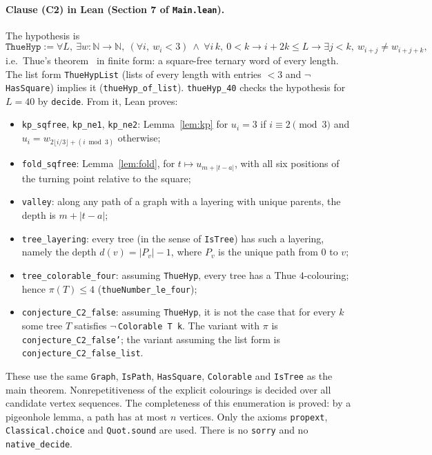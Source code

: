 \documentclass[11pt]{article}
\theoremstyle{definition}
\theoremstyle{remark}
\begin{document}
\paragraph{Clause (C2) in Lean (Section 7 of \texttt{Main.lean}).} The hypothesis is
\[
\texttt{ThueHyp} := \forall L,\ \exists w:\mathbb N\to\mathbb N,\ (\forall i,\ w_i<3)\ \wedge\
\forall i\,k,\ 0<k\to i+2k\le L\to \exists j<k,\ w_{i+j}\ne w_{i+j+k},
\]
i.e.\ Thue's theorem~\cite{Thue,Berstel} in finite form: a square-free ternary word of every
length. The list form \texttt{ThueHypList} (lists of every length with entries $<3$ and
$\neg$\,\texttt{HasSquare}) implies it (\texttt{thueHyp\_of\_list}).
\texttt{thueHyp\_40} checks the hypothesis for $L=40$ by \texttt{decide}. From it, Lean
proves:
\begin{itemize}
\item \texttt{kp\_sqfree}, \texttt{kp\_ne1}, \texttt{kp\_ne2}: Lemma~\ref{lem:kp} for
$u_i=3$ if $i\equiv2\pmod 3$ and $u_i=w_{2\lfloor i/3\rfloor+(i\bmod 3)}$ otherwise;
\item \texttt{fold\_sqfree}: Lemma~\ref{lem:fold}, for $t\mapsto u_{m+|t-a|}$, with all six
positions of the turning point relative to the square;
\item \texttt{valley}: along any path of a graph with a layering with unique parents, the depth
is $m+|t-a|$;
\item \texttt{tree\_layering}: every tree (in the sense of \texttt{IsTree}) has such a layering,
namely the depth $d(v)=|P_v|-1$, where $P_v$ is the unique path from $0$ to $v$;
\item \texttt{tree\_colorable\_four}: assuming \texttt{ThueHyp}, every tree has a Thue
$4$-colouring; hence $\pi(T)\le4$ (\texttt{thueNumber\_le\_four});
\item \texttt{conjecture\_C2\_false}: assuming \texttt{ThueHyp}, it is not the case that for
every $k$ some tree $T$ satisfies $\neg$\,\texttt{Colorable T k}. The variant with $\pi$ is
\texttt{conjecture\_C2\_false'}; the variant assuming the list form is
\texttt{conjecture\_C2\_false\_list}.
\end{itemize}
These use the same \texttt{Graph}, \texttt{IsPath}, \texttt{HasSquare}, \texttt{Colorable} and
\texttt{IsTree} as the main theorem.
Nonrepetitiveness of the explicit colourings is decided over all candidate vertex sequences. The
completeness of this enumeration is proved: by a pigeonhole lemma, a path has at most $n$
vertices. Only the axioms \texttt{propext}, \texttt{Classical.choice} and \texttt{Quot.sound}
are used. There is no \texttt{sorry} and no \texttt{native\_decide}.
\end{document}
